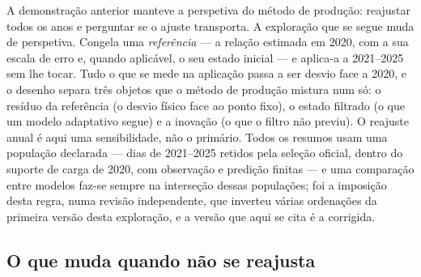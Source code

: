 A demonstração anterior manteve a perspetiva do método de produção:
reajustar todos os anos e perguntar se o ajuste transporta. A exploração
que se segue muda de perspetiva. Congela uma \emph{referência} --- a relação
estimada em 2020, com a sua escala de erro e, quando aplicável, o seu estado
inicial --- e aplica-a a 2021--2025 sem lhe tocar. Tudo o que se mede na
aplicação passa a ser desvio face a 2020, e o desenho separa três objetos
que o método de produção mistura num só: o resíduo da referência (o desvio
físico face ao ponto fixo), o estado filtrado (o que um modelo adaptativo
segue) e a inovação (o que o filtro não previu). O reajuste anual é aqui
uma sensibilidade, não o primário. Todos os resumos usam uma população
declarada --- dias de 2021--2025 retidos pela seleção oficial, dentro do
suporte de carga de 2020, com observação e predição finitas --- e uma
comparação entre modelos faz-se sempre na interseção dessas populações; foi
a imposição desta regra, numa revisão independente, que inverteu várias
ordenações da primeira versão desta exploração, e a versão que aqui se cita
é a corrigida.

\subsection{O que muda quando não se reajusta}
\label{sec:referencia-fixa}

